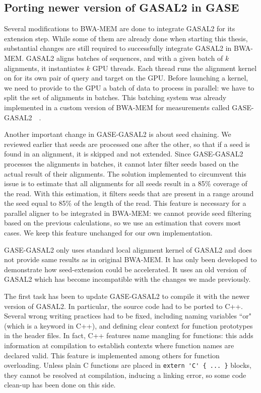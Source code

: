 \subsection{Porting newer version of GASAL2 in GASE}

Several modifications to BWA-MEM are done to integrate GASAL2 for its extension step. While some of them are already done when starting this thesis, substantial changes are still required to successfully integrate GASAL2 in BWA-MEM. 
GASAL2 aligns batches of sequences, and with a given batch of $k$ alignments, it instantiates $k$ GPU threads. Each thread runs the alignment kernel on for its own pair of query and target on the GPU. Before launching a kernel, we need to provide to the GPU a batch of data to process in parallel: we have to split the set of alignments in batches. This batching system was already implemented in a custom version of BWA-MEM for measurements called GASE-GASAL2~\cite{Ahmed:gase-gasal2}~\cite{Ahmed:GASE}. 

Another important change in GASE-GASAL2 is about seed chaining. We reviewed earlier that seeds are processed one after the other, so that if a seed is found in an alignment, it is skipped and not extended. Since GASE-GASAL2 processes the alignments in batches, it cannot later filter seeds based on the actual result of their alignments. The solution implemented to circumvent this issue is to estimate that all alignments for all seeds result in a 85\% coverage of the read. With this estimation, it filters seeds that are present in a range around the seed equal to 85\% of the length of the read. This feature is necessary for a parallel aligner to be integrated in BWA-MEM: we cannot provide seed filtering based on the previous calculations, so we use an estimation that covers most cases. We keep this feature unchanged for our own implementation.

GASE-GASAL2 only uses standard local alignment kernel of GASAL2 and does not provide same results as in original BWA-MEM. It has only been developed to demonstrate how seed-extension could be accelerated. It uses an old version of GASAL2 which has become incompatible with the changes we made previously.

The first task has been to update GASE-GASAL2 to compile it with the newer version of GASAL2. In particular, the source code had to be ported to C++. Several wrong writing practices had to be fixed, including naming variables ``or" (which is a keyword in C++), and defining clear context for function prototypes in the header files. In fact, C++ features name mangling for functions: this adds information at compilation to establish contexts where function names are declared valid. This feature is implemented among others for function overloading. Unless plain C functions are placed in \verb|extern 'C' { ... }| blocks, they cannot be resolved at compilation, inducing a linking error, so some code clean-up has been done on this side.